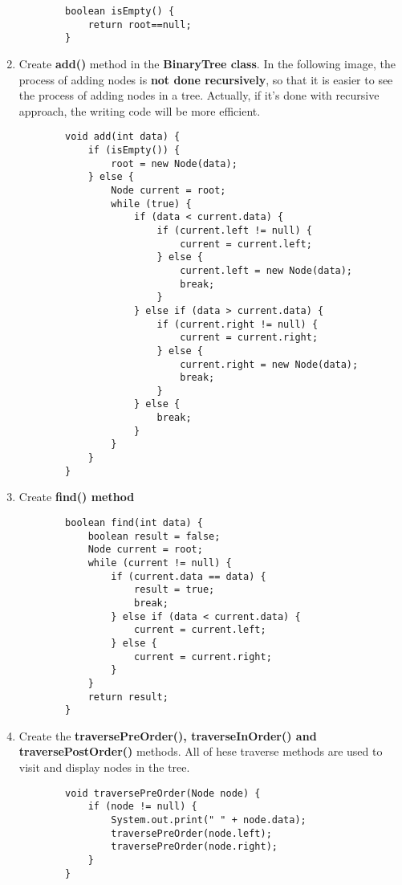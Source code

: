 \documentclass[12pt,titlepage]{article}
\begin{document}
\begin{enumerate}
\begin{verbatim}
        boolean isEmpty() {
            return root==null;
        }
    \end{verbatim}
    \item Create \textbf{add()} method in the \textbf{BinaryTree class}. In the following image, the process of adding nodes is \textbf{not done recursively}, so that it is easier to see the process of adding nodes in a tree. Actually, if it’s done with recursive approach, the writing code will be more efficient.
    \begin{verbatim}
        void add(int data) {
            if (isEmpty()) {
                root = new Node(data);
            } else {
                Node current = root;
                while (true) {
                    if (data < current.data) {
                        if (current.left != null) {
                            current = current.left;
                        } else {
                            current.left = new Node(data);
                            break;
                        }
                    } else if (data > current.data) {
                        if (current.right != null) {
                            current = current.right;
                        } else {
                            current.right = new Node(data);
                            break;
                        }
                    } else {
                        break;
                    }
                }
            }
        }
    \end{verbatim}
    \item Create \textbf{find() method}
    \begin{verbatim}
        boolean find(int data) {
            boolean result = false;
            Node current = root;
            while (current != null) {
                if (current.data == data) {
                    result = true;
                    break;
                } else if (data < current.data) {
                    current = current.left;
                } else {
                    current = current.right;
                }
            }
            return result;
        }
    \end{verbatim}
    \item Create the \textbf{traversePreOrder(), traverseInOrder() and traversePostOrder()} methods. All of hese traverse methods are used to visit and display nodes in the tree.
    \begin{verbatim}
        void traversePreOrder(Node node) {
            if (node != null) {
                System.out.print(" " + node.data);
                traversePreOrder(node.left);
                traversePreOrder(node.right);
            }
        }


\end{verbatim}
\end{enumerate}
\end{document}
